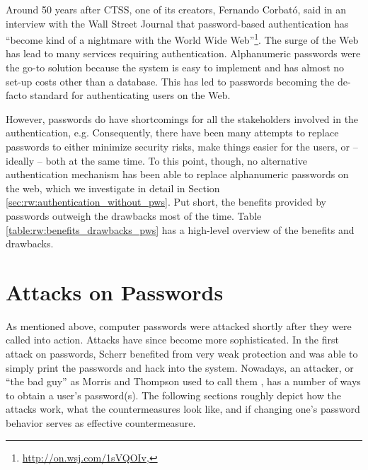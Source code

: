 


Around 50 years after CTSS, one of its creators, Fernando Corbató, said in an interview with the Wall Street Journal that password-based authentication has ``become kind of a nightmare with the World Wide Web''\footnote{\label{foot:corbato_regrets}\url{http://on.wsj.com/1sVQOIv}, }. The surge of the Web has lead to many services requiring authentication. Alphanumeric passwords were the go-to solution because the system is easy to implement and has almost no set-up costs other than a database. This has led to passwords becoming the de-facto standard for authenticating users on the Web.

However, passwords do have shortcomings for all the stakeholders involved in the authentication, e.g. Consequently, there have been many attempts to replace passwords to either minimize security risks, make things easier for the users, or -- ideally -- both at the same time. To this point, though, no alternative authentication mechanism has been able to replace alphanumeric passwords on the web, which we investigate in detail in Section \ref{sec:rw:authentication_without_pws}. Put short, the benefits provided by passwords outweigh the drawbacks most of the time. Table \ref{table:rw:benefits_drawbacks_pws} has a high-level overview of the benefits and drawbacks.




\section{Attacks on Passwords}\label{sec:rw:attack_vectors}
As mentioned above, computer passwords were attacked shortly after they were called into action. Attacks have since become more sophisticated. In the first attack on passwords, Scherr benefited from very weak protection and was able to simply print the passwords and hack into the system. Nowadays, an attacker, or ``the bad guy'' as Morris and Thompson used to call them \cite{Morris1979PasswordSecurity}, has a number of ways to obtain a user's password(s). The following sections roughly depict how the attacks work, what the countermeasures look like, and if changing one's password behavior serves as effective countermeasure. 


